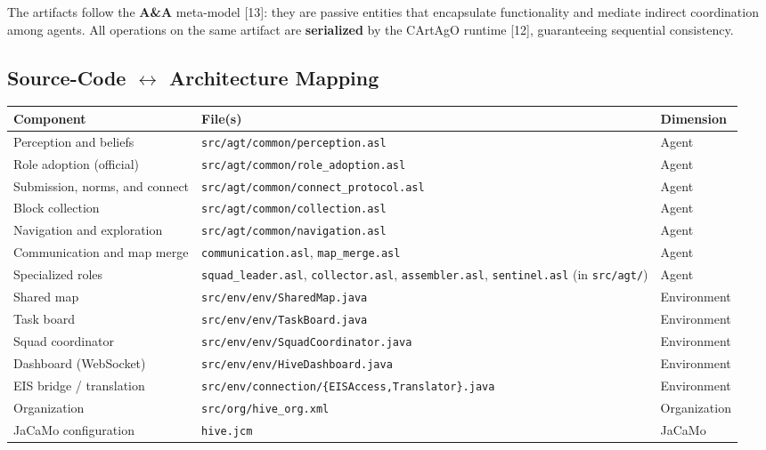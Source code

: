 \documentclass[11pt,a4paper]{article}
\newcommand{\code}[1]{\texttt{#1}}
\begin{document}
The artifacts follow the \textbf{A\&A} meta-model [13]: they are passive entities that encapsulate functionality and mediate indirect coordination among agents. All operations on the same artifact are \textbf{serialized} by the CArtAgO runtime [12], guaranteeing sequential consistency.

\subsection{Source-Code $\leftrightarrow$ Architecture Mapping}
\begin{table}[H]
\centering
\footnotesize
\begin{tabularx}{\linewidth}{X l l}
\toprule
\textbf{Component} & \textbf{File(s)} & \textbf{Dimension} \\
\midrule
Perception and beliefs & \code{src/agt/common/perception.asl} & Agent \\
Role adoption (official) & \code{src/agt/common/role\_adoption.asl} & Agent \\
Submission, norms, and connect & \code{src/agt/common/connect\_protocol.asl} & Agent \\
Block collection & \code{src/agt/common/collection.asl} & Agent \\
Navigation and exploration & \code{src/agt/common/navigation.asl} & Agent \\
Communication and map merge & \code{communication.asl}, \code{map\_merge.asl} & Agent \\
Specialized roles & \code{squad\_leader.asl}, \code{collector.asl}, \code{assembler.asl}, \code{sentinel.asl} (in \code{src/agt/}) & Agent \\
Shared map & \code{src/env/env/SharedMap.java} & Environment \\
Task board & \code{src/env/env/TaskBoard.java} & Environment \\
Squad coordinator & \code{src/env/env/SquadCoordinator.java} & Environment \\
Dashboard (WebSocket) & \code{src/env/env/HiveDashboard.java} & Environment \\
EIS bridge / translation & \code{src/env/connection/\{EISAccess,Translator\}.java} & Environment \\
Organization & \code{src/org/hive\_org.xml} & Organization \\
JaCaMo configuration & \code{hive.jcm} & JaCaMo \\
\bottomrule
\end{tabularx}
\end{table}
\end{document}
